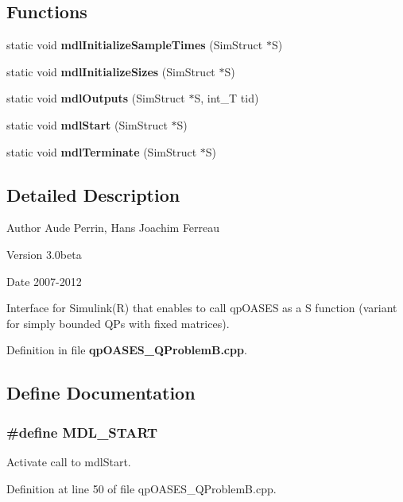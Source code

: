 \subsection*{Functions}
\begin{DoxyCompactItemize}
\item 
static void {\bf mdlInitializeSampleTimes} (SimStruct $\ast$S)
\item 
static void {\bf mdlInitializeSizes} (SimStruct $\ast$S)
\item 
static void {\bf mdlOutputs} (SimStruct $\ast$S, int\_\-T tid)
\item 
static void {\bf mdlStart} (SimStruct $\ast$S)
\item 
static void {\bf mdlTerminate} (SimStruct $\ast$S)
\end{DoxyCompactItemize}


\subsection{Detailed Description}
\begin{DoxyAuthor}{Author}
Aude Perrin, Hans Joachim Ferreau 
\end{DoxyAuthor}
\begin{DoxyVersion}{Version}
3.0beta 
\end{DoxyVersion}
\begin{DoxyDate}{Date}
2007-\/2012
\end{DoxyDate}
Interface for Simulink(R) that enables to call qpOASES as a S function (variant for simply bounded QPs with fixed matrices). 

Definition in file {\bf qpOASES\_\-QProblemB.cpp}.



\subsection{Define Documentation}
\subsubsection[{MDL\_\-START}]{\setlength{\rightskip}{0pt plus 5cm}\#define MDL\_\-START}\label{qpOASES__QProblemB_8cpp_ac032abbf580c891fb0c11e63e9bc668a}
Activate call to mdlStart. 

Definition at line 50 of file qpOASES\_\-QProblemB.cpp.

